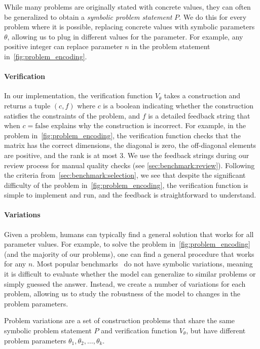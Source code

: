 While many problems are originally stated with concrete values, they can often be generalized to obtain a \emph{symbolic problem statement} $P$. We do this for every problem where it is possible, replacing concrete values with symbolic parameters $\theta$, allowing us to plug in different values for the parameter. For example, any positive integer can replace parameter $n$ in the problem statement in~\cref{fig:problem_encoding}.

\paragraph{Verification}
In our implementation, the verification function $V_\theta$ takes a construction and returns a tuple $(c, f)$ where $c$ is a boolean indicating whether the construction satisfies the constraints of the problem, and $f$ is a detailed feedback string that when $c=\mathrm{false}$ explains why the construction is incorrect.
For example, in the problem in~\cref{fig:problem_encoding}, the verification function checks that the matrix has the correct dimensions, the diagonal is zero, the off-diagonal elements are positive, and the rank is at most 3.
We use the feedback strings during our review process for manual quality checks (see \cref{sec:benchmark:review}). 
Following the criteria from~\cref{sec:benchmark:selection}, we see that despite the significant difficulty of the problem in~\cref{fig:problem_encoding}, the verification function is simple to implement and run, and the feedback is straightforward to understand.

\paragraph{Variations}

Given a problem, humans can typically find a general solution that works for all parameter values.
For example, to solve the problem in~\cref{fig:problem_encoding} (and the majority of our problems), one can find a general procedure that works for any $n$.
Most popular benchmarks~\cite{hendrycks2021math, omnimath, olympiadbench} do not have symbolic variations, meaning it is difficult to evaluate whether the model can generalize to similar problems or simply guessed the answer.
Instead, we create a number of variations for each problem, allowing us to study the robustness of the model to changes in the problem parameters.

\begin{definition}
    Problem variations are a set of construction problems that share the same symbolic problem statement $P$ and verification function $V_\theta$, but have different problem parameters $\theta_1, \theta_2, \ldots, \theta_k$.
\end{definition}


